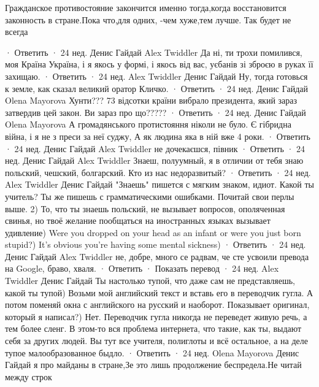 \begin{itemize}
\begin{itemize}
Гражданское противостояние закончится именно тогда,когда восстановится законность в стране.Пока что,для одних, -чем хуже,тем лучше. Так будет не всегда

 · Ответить · 24 нед.
Денис Гайдай
Alex Twiddler Да ні, ти трохи помилився, моя Країна Україна, і я якось у формі, і якось від вас, уєбанів зі зброєю в руках її захищаю.
 · Ответить · 24 нед.
Alex Twiddler
Денис Гайдай Ну, тогда готовься к земле, как сказал великий оратор Кличко.
 · Ответить · 24 нед.
Денис Гайдай
Olena Mayorova Хунти??? 73 відсотки країни вибрало президента, який зараз затвердив цей закон. Ви зараз про що?????
 · Ответить · 24 нед.
Денис Гайдай
Olena Mayorova А громадянського протистояння ніколи не було. Є гібридна війна, і я не з преси за неї суджу, А як людина яка в ній вже 4 роки.
 · Ответить · 24 нед.
Денис Гайдай
Alex Twiddler не дочекаєшся, півник
 · Ответить · 24 нед.
Денис Гайдай
Alex Twiddler Знаеш, полуумный, я в отличии от тебя знаю польский, чешский, болгарский. Кто из нас недоразвитый?
 · Ответить · 24 нед.
Alex Twiddler
Денис Гайдай "Знаешь" пишется с мягким знаком, идиот. Какой ты учитель? Ты же пишешь с грамматическими ошибками. Почитай свои перлы выше. 2) То, что ты знаешь польский, не вызывает вопросов, ополяченная свинья, но твоё желание пообщаться на иностранных языках вызывает удивление) Were you dropped on your head as an infant or were you just born stupid?) It's obvious you're having some mental sickness)
 · Ответить · 24 нед.
Денис Гайдай
Alex Twiddler не, добре, много се радвам, че сте усвоили превода на Google, браво, хваля.
 · Ответить · Показать перевод · 24 нед.
Alex Twiddler
Денис Гайдай Ты настолько тупой, что даже сам не представляешь, какой ты тупой) Возьми мой английский текст и вставь его в переводчик гугла. А потом поменяй окна с английского на русский и наоборот. Показывает оригинал, который я написал?) Нет. Переводчик гугла никогда не переведет живую речь, а тем более сленг. В этом-то вся проблема интернета, что такие, как ты, выдают себя за других людей. Вы тут все учителя, полиглоты и всё остальное, а на деле тупое малообразованное быдло.
 · Ответить · 24 нед.
Olena Mayorova
Денис Гайдай я про майданы в стране,Зе это лишь продолжение беспредела.Не читай между строк
\end{itemize}

\end{itemize}

